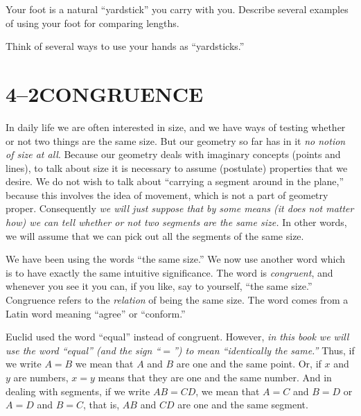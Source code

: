 \documentclass[11pt]{book}
\theoremstyle{bkplain}
\theoremstyle{XIplainnote}
\theoremstyle{bkplain}
\theoremstyle{bkplain}
\begin{document}

\begin{exercisecols}
\begin{exlist}
\item Your foot is a natural ``yardstick'' you carry with you. Describe several
      examples of using your foot for comparing lengths.
\item Think of several ways to use your hands as ``yardsticks.''
\end{exlist}
\end{exercisecols}

\section*{4--2\quad CONGRUENCE}

In daily life we are often interested in size, and we have ways of testing
whether or not two things are the same size. But our geometry so far has in it
\emph{no notion of size at all}. Because our geometry deals with imaginary
concepts (points and lines), to talk about size it is necessary to assume
(postulate) properties that we desire. We do not wish to talk about ``carrying a
segment around in the plane,'' because this involves the idea of movement, which
is not a part of geometry proper. Consequently \emph{we will just suppose that by
some means (it does not matter how) we can tell whether or not two segments are
the same size.} In other words, we will assume that we can pick out all the
segments of the same size.

We have been using the words ``the same size.'' We now use another word which is
to have exactly the same intuitive significance. The word is \emph{congruent},
and whenever you see it you can, if you like, say to yourself, ``the same size.''
Congruence refers to the \emph{relation} of being the same size. The word comes
from a Latin word meaning ``agree'' or ``conform.''

Euclid used the word ``equal'' instead of congruent. However, \emph{in this book
we will use the word ``equal'' (and the sign ``$=$'') to mean ``identically the
same.''} Thus, if we write $A = B$ we mean that $A$ and $B$ are one and the same
point. Or, if $x$ and $y$ are numbers, $x = y$ means that they are one and the
same number. And in dealing with segments, if we write $AB = CD$, we mean that
$A = C$ and $B = D$ or $A = D$ and $B = C$, that is, $AB$ and $CD$ are one and
the same segment.
\end{document}

